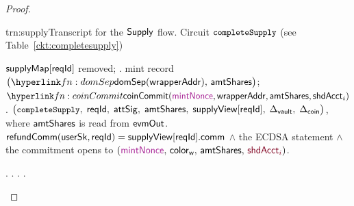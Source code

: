 \begin{proof}
\begin{itemize} [label=$\blacksquare$]
\begin{itemize}
\begin{TxtBox}{trn:supply}{Transcript for the $\mathsf{Supply}$ flow.}
\vspace{5pt}
Circuit $\texttt{\small completeSupply}$ (see Table~\ref{ckt:completesupply})
\begin{OutList}
\oitem{\Dvault} $\mathsf{supplyMap}[\mathsf{reqId}]$ removed; .
\oitem{\Dshd} \bluedot mint record $\bigl(\lnk{fn:domSep}{\domSep(\wrapAddr)},\, \amtShares\bigr)$; \;
  \bluedot $\lnk{fn:coinCommit}{\coinCommit(\freshrn{\mintNonce}, \wrapAddr, \amtShares, \shdAcct_i)}$.
\oitem{\stmt} $\bigl(\texttt{\small completeSupply},\; \mathsf{reqId},\; \mathsf{attSig},\; \mathsf{amtShares},\;
  \mathsf{supplyView}[\mathsf{reqId}],\; \Delta_{\mathsf{vault}},\;
  \Delta_{\mathsf{coin}}\bigr)$, where $\mathsf{amtShares}$ is read from $\mathsf{evmOut}$.
\oitem{\Rel} $\mathsf{refundComm}(\mathsf{userSk}, \mathsf{reqId}) = \mathsf{supplyView}[\mathsf{reqId}].\mathsf{comm}$
  \;$\wedge$\; the ECDSA statement \;$\wedge$\; the commitment opens to
  $(\freshrn{\mintNonce},\, \colrW,\, \amtShares,\, \secret{\shdAcct_i})$.
\end{OutList}

\vspace{5pt}
\begin{OutList}
\oitem{\Dvault} .
\oitem{\Dshd} .
\oitem{\stmt} \upd{$\bigl(\cktRefundSupply,\; \rid,\; \attSig,\; \supplyView[\rid],\; \Dvault,\;
  \Dshd\bigr)$}.
\oitem{\Rel} .
\end{OutList}

\end{TxtBox}



\end{itemize}
\end{itemize}
\end{proof}
